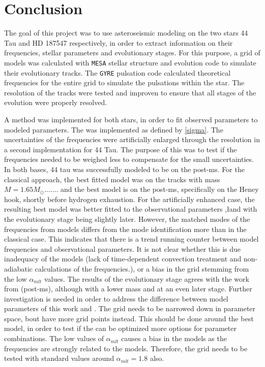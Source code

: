 \chapter{Conclusion}
\label{sec:conclusion}

The goal of this project was to use asteroseismic modeling on the two stars 44 Tau and HD 187547 respectively, in order to extract information on their frequencies, stellar parameters and evolutionary stages. For this purpose, a grid of models was calculated with \texttt{MESA} stellar structure and evolution code to simulate their evolutionary tracks. The \texttt{GYRE}  pulsation code calculated theoretical frequencies for the entire grid to simulate the pulsations within the star. The resolution of the tracks were tested and improven to ensure that all stages of the evolution were properly resolved. 

A \chis method was implemented for both stars, in order to fit observed parameters to modeled parameters.  The \chis was implemented as defined by \eqref{sigma}. The uncertainties of the frequencies were artificially enlarged through the resolution in a second \chis implementation for 44 Tau. The purpose of this was to test if the frequencies needed to be weighed less to compensate for the small uncertainties. In both bases, 44 tau was successfully modeled to be on the post-ms. For the classical \chis approach, the best fitted model was on the tracks with mass $M=1.65M_\odot$....... and the best model is on the post-ms, specifically on the Heney hook, shortly before hydrogen exhaustion. For the artificially enhanced case, the resulting best model was better fitted to the observational parameters \teff,\l and \logg with the evolutionary stage being slightly later. However, the matched modes of the frequencies from models differs from the mode identification more than in the classical case. This indicates that there is a trend running counter between model frequencies and observational parameters. It is not clear whether this is due inadequacy of the models (lack of time-dependent convection treatment and non-adiabatic calculations of the frequencies.), or a bias in the grid stemming from the low $\alpha_{mlt}$ values. 
The results of the evolutionary stage agrees with the work from \citet{lenz2010delta}(post-ms), although with a lower mass and at an even later stage. Further investigation is needed in order to address the difference between model parameters of this work and \citet{lenz2010delta}. The grid needs to be narrowed down in parameter space, bout have more grid points instead. This should be done around the best model, in order to test if the \chis can be optimized more options for parameter combinations. The low values of $\alpha_{mlt}$ causes a bias in the models as the frequencies are strongly related to the models. Therefore, the grid needs to be tested with standard values around $\alpha_{mlt}=1.8$ also. 

